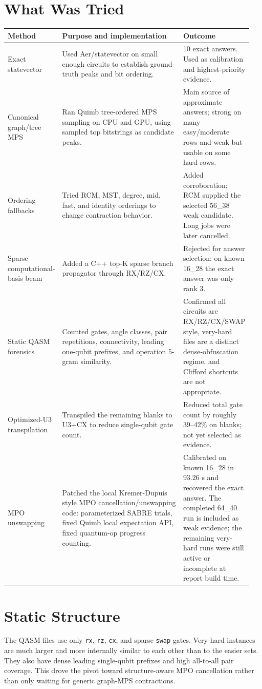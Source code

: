 \documentclass[10pt]{article}
\begin{document}
\section*{What Was Tried}
\begin{longtable}{p{0.22\linewidth} p{0.51\linewidth} p{0.22\linewidth}}
\toprule
Method & Purpose and implementation & Outcome \\
\midrule
Exact statevector & Used Aer/statevector on small enough circuits to establish ground-truth peaks and bit ordering. & 10 exact answers. Used as calibration and highest-priority evidence. \\
Canonical graph/tree MPS & Ran Quimb tree-ordered MPS sampling on CPU and GPU, using sampled top bitstrings as candidate peaks. & Main source of approximate answers; strong on many easy/moderate rows and weak but usable on some hard rows. \\
Ordering fallbacks & Tried RCM, MST, degree, mid, fast, and identity orderings to change contraction behavior. & Added corroboration; RCM supplied the selected 56\_38 weak candidate. Long jobs were later cancelled. \\
Sparse computational-basis beam & Added a C++ top-K sparse branch propagator through RX/RZ/CX. & Rejected for answer selection: on known 16\_28 the exact answer was only rank 3. \\
Static QASM forensics & Counted gates, angle classes, pair repetitions, connectivity, leading one-qubit prefixes, and operation 5-gram similarity. & Confirmed all circuits are RX/RZ/CX/SWAP style, very-hard files are a distinct dense-obfuscation regime, and Clifford shortcuts are not appropriate. \\
Optimized-U3 transpilation & Transpiled the remaining blanks to U3+CX to reduce single-qubit gate count. & Reduced total gate count by roughly 39--42\% on blanks; not yet selected as evidence. \\
MPO unswapping & Patched the local Kremer-Dupuis style MPO cancellation/unswapping code: parameterized SABRE trials, fixed Quimb local expectation API, fixed quantum-op progress counting. & Calibrated on known 16\_28 in 93.26 s and recovered the exact answer. The completed 64\_40 run is included as weak evidence; the remaining very-hard runs were still active or incomplete at report build time. \\
\bottomrule
\end{longtable}

\section*{Static Structure}
The QASM files use only \texttt{rx}, \texttt{rz}, \texttt{cx}, and sparse \texttt{swap} gates. Very-hard instances are
much larger and more internally similar to each other than to the easier sets. They also have dense leading single-qubit
prefixes and high all-to-all pair coverage. This drove the pivot toward structure-aware MPO cancellation rather than only
waiting for generic graph-MPS contractions.
\end{document}
